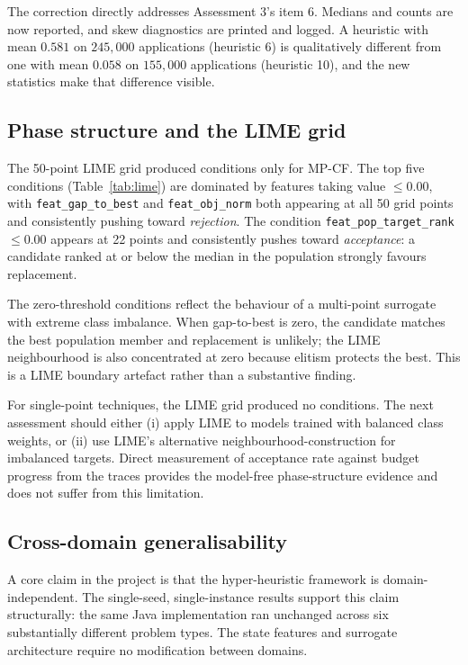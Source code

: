 \documentclass[11pt,a4paper]{article}
\begin{document}
The correction directly addresses Assessment 3's item 6. Medians and counts are
now reported, and skew diagnostics are printed and logged. A heuristic with mean
$0.581$ on $245{,}000$ applications (heuristic 6) is qualitatively different from
one with mean $0.058$ on $155{,}000$ applications (heuristic 10), and the new
statistics make that difference visible.

\subsection{Phase structure and the LIME grid}

The 50-point LIME grid produced conditions only for MP-CF. The top five conditions
(Table~\ref{tab:lime}) are dominated by features taking value $\leq 0.00$, with
\texttt{feat\_gap\_to\_best} and \texttt{feat\_obj\_norm} both appearing at all 50
grid points and consistently pushing toward \emph{rejection}. The condition
\texttt{feat\_pop\_target\_rank} $\leq 0.00$ appears at 22 points and consistently
pushes toward \emph{acceptance}: a candidate ranked at or below the median in the
population strongly favours replacement.

The zero-threshold conditions reflect the behaviour of a multi-point surrogate with
extreme class imbalance. When gap-to-best is zero, the candidate matches the best
population member and replacement is unlikely; the LIME neighbourhood is also
concentrated at zero because elitism protects the best. This is a LIME boundary
artefact rather than a substantive finding.

For single-point techniques, the LIME grid produced no conditions. The next
assessment should either (i) apply LIME to models trained with balanced class
weights, or (ii) use LIME's alternative neighbourhood-construction for imbalanced
targets. Direct measurement of acceptance rate against budget progress from the
traces provides the model-free phase-structure evidence and does not suffer from
this limitation.

\subsection{Cross-domain generalisability}

A core claim in the project is that the hyper-heuristic framework is
domain-independent. The single-seed, single-instance results support this claim
structurally: the same Java implementation ran unchanged across six substantially
different problem types. The state features and surrogate architecture require no
modification between domains.
\end{document}
